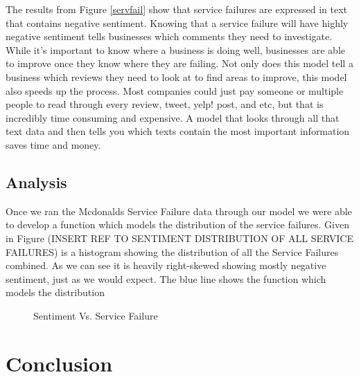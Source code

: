 \documentclass[titlepage,letterpaper]{article}
\begin{document}
The results from Figure \ref{servfail} show that service failures are expressed in text that contains negative sentiment. Knowing that a service failure will have highly negative sentiment tells businesses which comments they need to investigate. While it's important to know where a business is doing well, businesses are able to improve once they know where they are failing. Not only does this model tell a business which reviews they need to look at to find areas to improve, this model also speeds up the process. Most companies could just pay someone or multiple people to read through every review, tweet, yelp! post, and etc, but that is incredibly time consuming and expensive. A model that looks through all that text data and then tells you which texts contain the most important information saves time and money.  


\label{servfail}

\subsection{Analysis}
Once we ran the Mcdonalds Service Failure data through our model we were able to develop a function which models the distribution of the service failures. Given in Figure (INSERT REF TO SENTIMENT DISTRIBUTION OF ALL SERVICE FAILURES) is a histogram showing the distribution of all the Service Failures combined. As we can see it is heavily right-skewed showing mostly negative sentiment, just as we would expect. The blue line shows the function which models the distribution 

%	

\begin{figure}[htb]
	\centering
	\caption{Sentiment Vs. Service Failure}
	\label{sentivfail}
	
\end{figure}



\section{Conclusion}


\clearpage


\printbibliography
\end{document}
